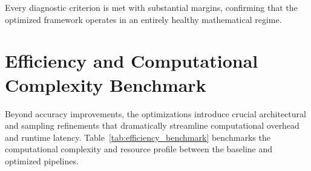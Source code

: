 \begin{table}[ht]
\centering
\small
\caption[Diagnostic validation criteria and empirical telemetry checklist]{Diagnostic validation criteria and empirical telemetry checklist comparing baseline and optimized training regimes.}
\label{tab:diagnostic_telemetry}
\end{table}

Every diagnostic criterion is met with substantial margins, confirming that the optimized framework operates in an entirely healthy mathematical regime.

\section{Efficiency and Computational Complexity Benchmark}
\label{sec:efficiency_benchmark}

Beyond accuracy improvements, the optimizations introduce crucial architectural and sampling refinements that dramatically streamline computational overhead and runtime latency. Table~\ref{tab:efficiency_benchmark} benchmarks the computational complexity and resource profile between the baseline and optimized pipelines.

